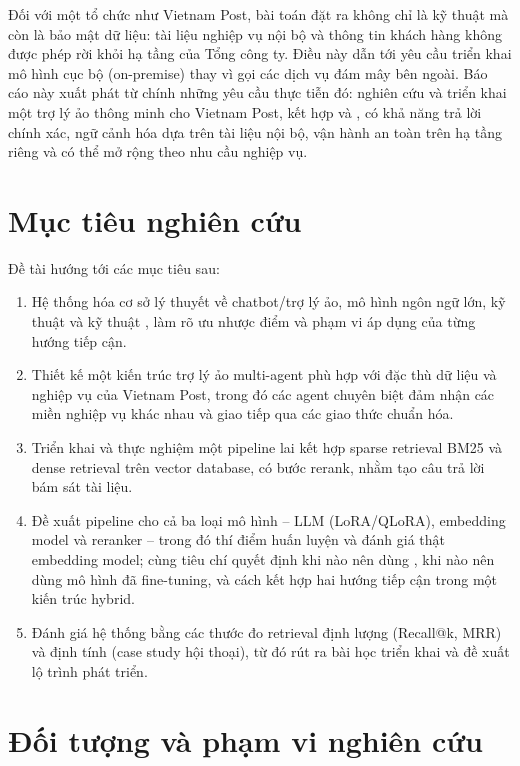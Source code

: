 Đối với một tổ chức như Vietnam Post, bài toán đặt ra không chỉ là kỹ thuật mà còn là bảo mật
dữ liệu: tài liệu nghiệp vụ nội bộ và thông tin khách hàng không được phép rời khỏi hạ
tầng của Tổng công ty. Điều này dẫn tới yêu cầu triển khai mô hình cục bộ
(on-premise) thay vì gọi các dịch vụ đám mây bên ngoài. Báo cáo này xuất phát từ chính
những yêu cầu thực tiễn đó: nghiên cứu và triển khai một trợ lý ảo thông minh cho Vietnam Post,
kết hợp \rag{} và \ft, có khả năng trả lời chính xác, ngữ cảnh hóa dựa trên tài liệu nội
bộ, vận hành an toàn trên hạ tầng riêng và có thể mở rộng theo nhu cầu nghiệp vụ.

\section{Mục tiêu nghiên cứu}

Đề tài hướng tới các mục tiêu sau:

\begin{enumerate}
  \item Hệ thống hóa cơ sở lý thuyết về chatbot/trợ lý ảo, mô hình ngôn ngữ lớn, kỹ thuật
  \rag{} và kỹ thuật \ft, làm rõ ưu nhược điểm và phạm vi áp dụng của từng hướng tiếp cận.
  \item Thiết kế một kiến trúc trợ lý ảo multi-agent phù hợp với đặc thù dữ
  liệu và nghiệp vụ của Vietnam Post, trong đó các agent chuyên biệt đảm nhận các miền nghiệp
  vụ khác nhau và giao tiếp qua các giao thức chuẩn hóa.
  \item Triển khai và thực nghiệm một pipeline \rag{} lai kết hợp sparse retrieval BM25 và
  dense retrieval trên vector database, có bước rerank, nhằm tạo câu trả lời bám
  sát tài liệu.
  \item Đề xuất pipeline \ft{} cho cả ba loại mô hình -- LLM (LoRA/QLoRA), embedding model và
  reranker -- trong đó thí điểm huấn luyện và đánh giá thật embedding model; cùng tiêu chí
  quyết định khi nào nên dùng \rag, khi nào nên dùng mô hình đã fine-tuning, và cách kết hợp
  hai hướng tiếp cận trong một kiến trúc hybrid.
  \item Đánh giá hệ thống bằng các thước đo retrieval định lượng (Recall@k, MRR) và định tính
  (case study hội thoại), từ đó rút ra bài học triển khai và đề xuất lộ trình phát triển.
\end{enumerate}

\section{Đối tượng và phạm vi nghiên cứu}

